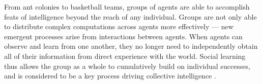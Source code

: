 \documentclass[12pt,letterpaper]{article}
\begin{document}










From ant colonies to basketball teams, groups of agents are able to accomplish feats of intelligence beyond the reach of any individual.
Groups are not only able to distribute complex computations across agents more effectively \cite{hutchins_cognition_1995} --- new emergent processes arise from interactions between agents. 
When agents can observe and learn from one another, they no longer need to independently obtain all of their information from direct experience with the world. 
Social learning thus allows the group as a whole to cumulatively build on individual successes, and is considered to be a key process driving collective intelligence \cite{boyd2011cultural,tomasello_natural_2014,  laland2017darwin}. %
\end{document}
